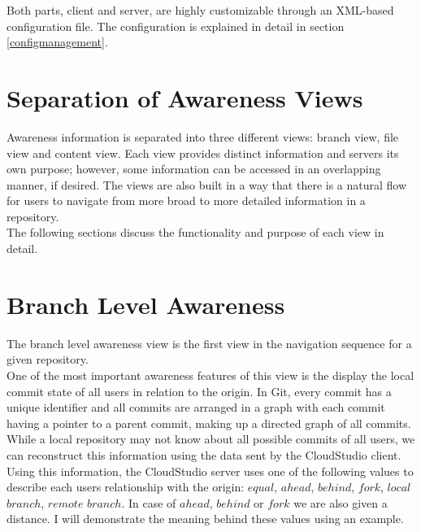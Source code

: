 Both parts, client and server, are highly customizable through an XML-based configuration file. The configuration is explained in detail in section \ref{configmanagement}.






\section{Separation of Awareness Views}

Awareness information is separated into three different views: branch view, file view and content view. Each view provides distinct information and servers its own purpose; however, some information can be accessed in an overlapping manner, if desired. The views are also built in a way that there is a natural flow for users to navigate from more broad to more detailed information in a repository. \\

The following sections discuss the functionality and purpose of each view in detail.







\section{Branch Level Awareness}




The branch level awareness view is the first view in the navigation sequence for a given repository. \\

One of the most important awareness features of this view is the display the local commit state of all users in relation to the origin. In Git, every commit has a unique identifier and all commits are arranged in a graph with each commit having a pointer to a parent commit, making up a directed graph of all commits. While a local repository may not know about all possible commits of all users, we can reconstruct this information using the data sent by the CloudStudio client. \\

Using this information, the CloudStudio server uses one of the following values to describe each users relationship with the origin: $equal$, $ahead$, $behind$, $fork$, $local$ $branch$, $remote$ $branch$. In case of $ahead$, $behind$ or $fork$ we are also given a distance. I will demonstrate the meaning behind these values using an example. \\

